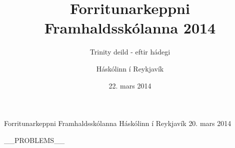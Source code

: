 \documentclass[11pt,a4paper,oneside]{article}
\title{Forritunarkeppni Framhaldsskólanna 2014}
\subtitle{Trinity deild - eftir hádegi}
\date{22. mars 2014}
\author{Háskólinn í Reykjavík}
\newcommand{\problemstatement}[1]{  }
\begin{document}

	\maketitle
	\thispagestyle{empty}
	\pagebreak

	\contest
	{Forritunarkeppni Framhaldsskólanna}%
	{Háskólinn í Reykjavík}%
	{20. mars 2014}%

    __PROBLEMS__

\end{document}

